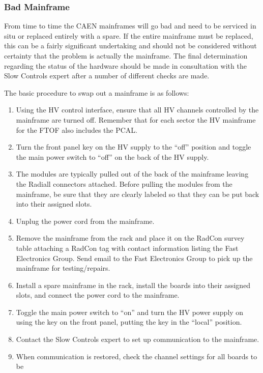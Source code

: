 \documentclass[12pt]{article}
\begin{document}
\subsubsection{Bad Mainframe}
\label{mainframe}

From time to time the CAEN mainframes will go bad and need to be serviced in situ or
replaced entirely with a spare. If the entire mainframe must be replaced, this can be
a fairly significant undertaking and should not be considered without certainty that 
the problem is actually the mainframe. The final determination regarding the status of 
the hardware should be made in consultation with the Slow Controls expert after a 
number of different checks are made.

The basic procedure to swap out a mainframe is as follows:

\begin{enumerate}
\item Using the HV control interface, ensure that all HV channels controlled by the
mainframe are turned off. Remember that for each sector the HV mainframe for the FTOF
also includes the PCAL.
\item Turn the front panel key on the HV supply to the ``off'' position and toggle the 
main power switch to ``off'' on the back of the HV supply.
\item The modules are typically pulled out of the back of the mainframe leaving the 
Radiall connectors attached. Before pulling the modules from the mainframe, be sure 
that they are clearly labeled so that they can be put back into their assigned slots.
\item Unplug the power cord from the mainframe.
\item Remove the mainframe from the rack and place it on the RadCon survey table
attaching a RadCon tag with contact information listing the Fast Electronics Group. 
Send email to the Fast Electronics Group to pick up the mainframe for testing/repairs.
\item Install a spare mainframe in the rack, install the boards into their assigned 
slots, and connect the power cord to the mainframe.
\item Toggle the main power switch to ``on'' and turn the HV power supply on using the 
key on the front panel, putting the key in the ``local'' position.
\item Contact the Slow Controls expert to set up communication to the mainframe.
\item When communication is restored, check the channel settings for all boards to be 

\end{enumerate}
\end{document}
